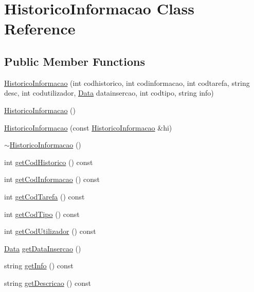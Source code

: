 \hypertarget{class_historico_informacao}{\section{Historico\-Informacao Class Reference}
\label{class_historico_informacao}
}
\subsection*{Public Member Functions}
\begin{DoxyCompactItemize}
\item 
\hyperlink{class_historico_informacao_ae1817600f1080a9eccade7dca6067a1b}{Historico\-Informacao} (int codhistorico, int codinformacao, int codtarefa, string desc, int codutilizador, \hyperlink{class_data}{Data} datainsercao, int codtipo, string info)
\item 
\hyperlink{class_historico_informacao_a3efeca40a4ea955a164929699e302e63}{Historico\-Informacao} ()
\item 
\hyperlink{class_historico_informacao_a1442dd2a0d34c470cebaabdf64cc5c94}{Historico\-Informacao} (const \hyperlink{class_historico_informacao}{Historico\-Informacao} \&hi)
\item 
\hyperlink{class_historico_informacao_a741b009f6182b63e0962d37e5b69336d}{$\sim$\-Historico\-Informacao} ()
\item 
int \hyperlink{class_historico_informacao_ac55b484ae616996f033028336625e3c9}{get\-Cod\-Historico} () const 
\item 
int \hyperlink{class_historico_informacao_a3f46d044ca8e92abaa31e92ca8ac2d8c}{get\-Cod\-Informacao} () const 
\item 
int \hyperlink{class_historico_informacao_ad8699917ce0d59771502092da1fe49d7}{get\-Cod\-Tarefa} () const 
\item 
int \hyperlink{class_historico_informacao_ad6ea3a0fd0bdac6dfa83f369c7942dcd}{get\-Cod\-Tipo} () const 
\item 
int \hyperlink{class_historico_informacao_a25e36a6becc59820e1196e9230ff3fd0}{get\-Cod\-Utilizador} () const 
\item 
\hyperlink{class_data}{Data} \hyperlink{class_historico_informacao_a439cde1cd1401648f7be7a6937594294}{get\-Data\-Insercao} ()
\item 
string \hyperlink{class_historico_informacao_a2f9888a9e20793f78ff2aaae4205137b}{get\-Info} () const 
\item 
string \hyperlink{class_historico_informacao_a4acbc48280710cc5269b42043382152f}{get\-Descricao} () const 

\end{DoxyCompactItemize}
